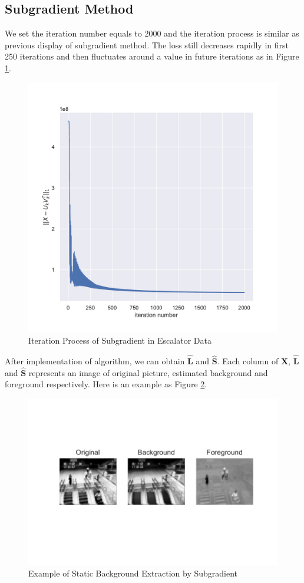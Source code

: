 \documentclass[conference]{IEEEtran}
\begin{document}
\subsection{Subgradient Method}
We set the iteration number equals to 2000 and the iteration process is similar as previous display of subgradient method. The loss still decreases rapidly in first 250 iterations and then fluctuates around a value in future iterations as in Figure \ref{sub_es1}.

\begin{figure}[htbp]
	\centering
	\includegraphics[width=0.6\linewidth]{image/Figure 9 Subgradient}
	\caption{Iteration Process of Subgradient in Escalator Data}
	\label{sub_es1}
\end{figure}

After implementation of algorithm, we can obtain $\boldsymbol{\widehat{L}}$ and $\boldsymbol{\widehat{S}}$. Each column of $\boldsymbol{X}$, $\boldsymbol{\widehat{L}}$ and $\boldsymbol{\widehat{S}}$ represents an image of original picture, estimated background and foreground respectively. Here is an example as Figure \ref{sub_es2}.

\begin{figure}[htbp]
	\centering
	\includegraphics[width=1\linewidth]{image/Figure 10 Subgradient}
	\caption{Example of Static Background Extraction by Subgradient}
	\label{sub_es2}
\end{figure}
\end{document}
